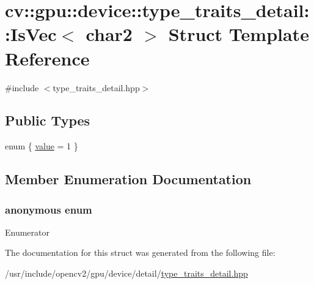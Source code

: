 \hypertarget{structcv_1_1gpu_1_1device_1_1type__traits__detail_1_1IsVec_3_01char2_01_4}{\section{cv\-:\-:gpu\-:\-:device\-:\-:type\-\_\-traits\-\_\-detail\-:\-:Is\-Vec$<$ char2 $>$ Struct Template Reference}
\label{structcv_1_1gpu_1_1device_1_1type__traits__detail_1_1IsVec_3_01char2_01_4}
}


{\ttfamily \#include $<$type\-\_\-traits\-\_\-detail.\-hpp$>$}

\subsection*{Public Types}
\begin{DoxyCompactItemize}
\item 
enum \{ \hyperlink{structcv_1_1gpu_1_1device_1_1type__traits__detail_1_1IsVec_3_01char2_01_4_ac1ebd06c176484fe732188b6d5faa929a97889a5bc9433024bbad1cb0f4524931}{value} = 1
 \}
\end{DoxyCompactItemize}


\subsection{Member Enumeration Documentation}
\hypertarget{structcv_1_1gpu_1_1device_1_1type__traits__detail_1_1IsVec_3_01char2_01_4_ac1ebd06c176484fe732188b6d5faa929}{\subsubsection[{anonymous enum}]{\setlength{\rightskip}{0pt plus 5cm}anonymous enum}}\label{structcv_1_1gpu_1_1device_1_1type__traits__detail_1_1IsVec_3_01char2_01_4_ac1ebd06c176484fe732188b6d5faa929}
\begin{Desc}
\item[Enumerator]\par
\begin{description}
\item[{\em 
\hypertarget{structcv_1_1gpu_1_1device_1_1type__traits__detail_1_1IsVec_3_01char2_01_4_ac1ebd06c176484fe732188b6d5faa929a97889a5bc9433024bbad1cb0f4524931}{value}\label{structcv_1_1gpu_1_1device_1_1type__traits__detail_1_1IsVec_3_01char2_01_4_ac1ebd06c176484fe732188b6d5faa929a97889a5bc9433024bbad1cb0f4524931}
}]\end{description}
\end{Desc}


The documentation for this struct was generated from the following file\-:\begin{DoxyCompactItemize}
\item 
/usr/include/opencv2/gpu/device/detail/\hyperlink{type__traits__detail_8hpp}{type\-\_\-traits\-\_\-detail.\-hpp}\end{DoxyCompactItemize}
